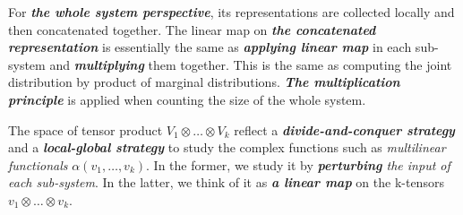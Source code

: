 \documentclass[11pt]{article}
\begin{document}
\begin{itemize}
\begin{remark}
For \emph{\textbf{the whole system perspective}}, its representations are collected locally and then concatenated together. The linear map on \emph{\textbf{the concatenated representation}} is essentially the same as \emph{\textbf{applying linear map}} in each sub-system and \emph{\textbf{multiplying}} them together. This is the same as computing the joint distribution by product of marginal distributions. \emph{\textbf{The multiplication principle}} is applied when counting the size of the whole system.

The space of tensor product $V_1\otimes \ldots \otimes V_k$ reflect a \emph{\textbf{divide-and-conquer strategy}} and a \emph{\textbf{local-global strategy}} to study the complex functions such as \emph{multilinear functionals} $\alpha(v_1, \ldots, v_k)$. In the former, we study it by \emph{\textbf{perturbing} the input of each sub-system}. In the latter, we think of it as \emph{\textbf{a linear map}} on the k-tensors $v_1 \otimes \ldots \otimes v_k$.
\end{remark}
\end{itemize}
\end{document}
